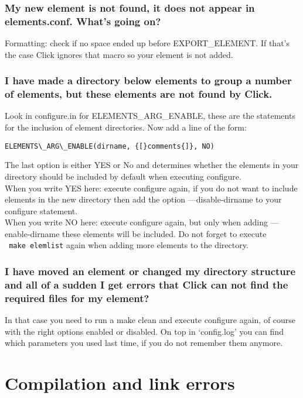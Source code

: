 \documentclass[a4paper]{article}
\begin{document}
\subsubsection*{My new element is not found, it does not appear in elements.conf. What's
going on?}

Formatting: check if no space ended up before EXPORT\_ELEMENT. If that's
the case Click ignores that macro so your element is not added.

\subsubsection*{I have made a directory below elements to group a number of elements,
but these elements are not found by Click.}

Look in configure.in for ELEMENTS\_ARG\_ENABLE, these are the statements
for the inclusion of element directories. Now add a line of the form:
\begin{lstlisting}
ELEMENTS\_ARG\_ENABLE(dirname, {[}comments{]}, NO)
\end{lstlisting}
The
last option is either YES or No and determines whether the elements in
your directory should be included by default when executing configure.
\\ When you write YES here: execute configure again, if you do not want
to include elements in the new directory then add the option
---disable-dirname to your configure statement.\\ When you write NO
here: execute configure again, but only when adding ---enable-dirname
these elements will be included. Do not forget to execute \\
\texttt{      make elemlist} again when adding more elements to the
directory.

\subsubsection*{I have moved an element or changed my directory structure and all of a
sudden I get errors that Click can not find the required files for my
element?}

In that case you need to run a make clean and execute configure again,
of course with the right options enabled or disabled. On top in
`config.log' you can find which parameters you used last time, if you do
not remember them anymore.

\section{Compilation and link errors}
\end{document}
